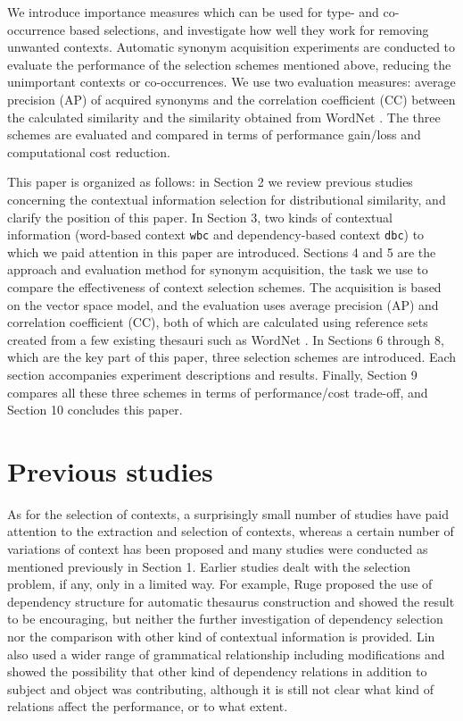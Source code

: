 \documentclass[english]{jnlp_1.4}
\begin{document}
We introduce importance measures which can be used for type- and
co-occurrence based selections, and investigate how well they work for
removing unwanted contexts. Automatic synonym acquisition experiments
are conducted to evaluate the performance of the selection schemes
mentioned above, reducing the unimportant contexts or
co-occurrences. We use two evaluation measures: average precision (AP)
of acquired synonyms and the correlation coefficient (CC) between the
calculated similarity and the similarity obtained from WordNet
\cite{Fellbaum:98}. The three schemes are evaluated and compared in
terms of performance gain/loss and computational cost reduction.


This paper is organized as follows: in Section 2 we review previous
studies concerning the contextual information selection for
distributional similarity, and clarify the position of this paper. In
Section 3, two kinds of contextual information (word-based context
{\tt wbc} and dependency-based context {\tt dbc}) to which we paid
attention in this paper are introduced. Sections 4 and 5 are the
approach and evaluation method for synonym acquisition, the task we
use to compare the effectiveness of context selection schemes. The
acquisition is based on the vector space model, and the evaluation
uses average precision (AP) and correlation coefficient (CC), both of
which are calculated using reference sets created from a few existing
thesauri such as WordNet \cite{Fellbaum:98}. In Sections 6 through 8,
which are the key part of this paper, three selection schemes are
introduced. Each section accompanies experiment descriptions and
results. Finally, Section 9 compares all these three schemes in terms
of performance/cost trade-off, and Section 10 concludes this paper.


\section{Previous studies}

As for the selection of contexts, a surprisingly small number of
studies have paid attention to the extraction and selection of
contexts, whereas a certain number of variations of context has been
proposed and many studies were conducted as mentioned previously in
Section 1. Earlier studies dealt with the selection problem, if any,
only in a limited way. For example, Ruge \cite{Ruge:97} proposed the
use of dependency structure for automatic thesaurus construction and
showed the result to be encouraging, but neither the further
investigation of dependency selection nor the comparison with other
kind of contextual information is provided. Lin
\cite{Lin:98:automatic} also used a wider range of grammatical
relationship including modifications and showed the possibility that
other kind of dependency relations in addition to subject and object
was contributing, although it is still not clear what kind of
relations affect the performance, or to what extent.
\end{document}
